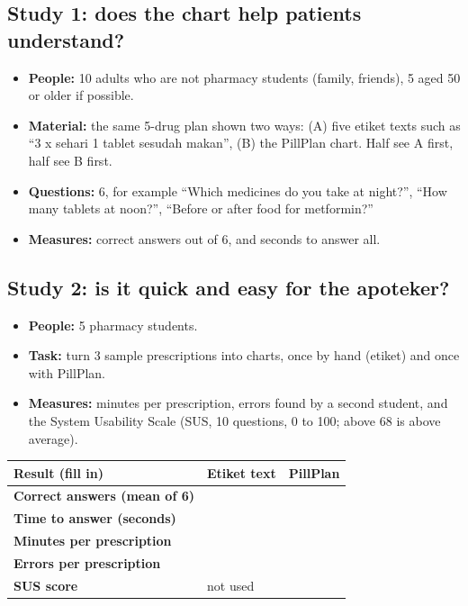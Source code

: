\documentclass[11pt]{article}
\begin{document}
\subsection{Study 1: does the chart help patients understand?}
\begin{itemize}
  \item \textbf{People:} 10 adults who are not pharmacy students (family, friends), 5 aged 50 or older if possible.
  \item \textbf{Material:} the same 5-drug plan shown two ways: (A) five etiket texts such as ``3 x sehari 1 tablet sesudah makan'', (B) the PillPlan chart. Half see A first, half see B first.
  \item \textbf{Questions:} 6, for example ``Which medicines do you take at night?'', ``How many tablets at noon?'', ``Before or after food for metformin?''
  \item \textbf{Measures:} correct answers out of 6, and seconds to answer all.
\end{itemize}

\subsection{Study 2: is it quick and easy for the apoteker?}
\begin{itemize}
  \item \textbf{People:} 5 pharmacy students.
  \item \textbf{Task:} turn 3 sample prescriptions into charts, once by hand (etiket) and once with PillPlan.
  \item \textbf{Measures:} minutes per prescription, errors found by a second student, and the System Usability Scale (SUS, 10 questions, 0 to 100; above 68 is above average).
\end{itemize}

\begin{tabularx}{\linewidth}{@{}>{\bfseries}X p{32mm} p{32mm}@{}}
\toprule
Result (fill in) & Etiket text & PillPlan \\
\midrule
Correct answers (mean of 6) & & \\
Time to answer (seconds) & & \\
Minutes per prescription & & \\
Errors per prescription & & \\
SUS score & not used & \\
\bottomrule
\end{tabularx}
\end{document}
